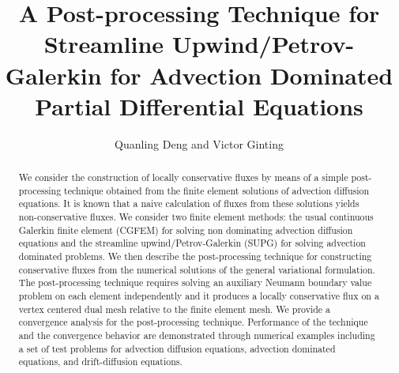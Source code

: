 \documentclass[times]{nlaauth}
\numberwithin{equation}{section}
\begin{document}

\title{A Post-processing Technique for Streamline Upwind/Petrov-Galerkin for Advection Dominated Partial Differential Equations}

\author{Quanling Deng  \corrauth \footnotemark[2] and Victor Ginting \footnotemark[2] }

\address{Department of Mathematics, University of Wyoming, 1000 E University Ave, Laramie, WY 82071, U.S.A.}


\begin{abstract}
We consider the construction of locally conservative fluxes by means of a simple post-processing technique obtained from the finite element solutions of advection diffusion equations. It is known that a naive calculation of fluxes from these solutions yields non-conservative fluxes. We consider two finite element methods: the usual continuous Galerkin finite element (CGFEM) for solving non dominating advection diffusion equations and the streamline upwind/Petrov-Galerkin (SUPG) for solving advection dominated problems. We then describe the post-processing technique for constructing conservative fluxes from the numerical solutions of the general variational formulation.  The post-processing technique requires solving an auxiliary Neumann boundary value problem on each element independently  and it produces a locally conservative flux on a vertex centered dual mesh relative to the finite element mesh.  We provide a convergence analysis for the post-processing technique. Performance of the technique and the convergence behavior are demonstrated through numerical examples including a set of test problems for advection diffusion equations, advection dominated equations, and drift-diffusion equations.
\end{abstract}


\maketitle


\vspace{-6pt}
\end{document}
